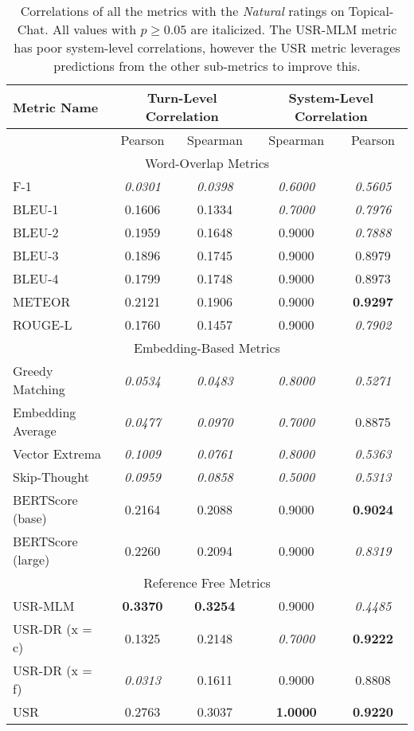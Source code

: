 \documentclass[11pt,a4paper]{article}
\begin{document}
\begin{table*}
    \centering
    \renewcommand*{\arraystretch}{1.2}
    \begin{tabular}{|l|c|c|c|c|}
    \hline
        \textbf{Metric Name} & \multicolumn{2}{|c|}{\textbf{Turn-Level Correlation}} & \multicolumn{2}{|c|}{\textbf{System-Level Correlation}}  \\ \hline
         & Pearson & Spearman & Spearman & Pearson \\ \hline
         \multicolumn{5}{|c|}{Word-Overlap Metrics} \\ \hline
F-1 & \textit{0.0301} & \textit{0.0398} & \textit{0.6000} & \textit{0.5605} \\
BLEU-1 & 0.1606 & 0.1334 & \textit{0.7000} & \textit{0.7976} \\
BLEU-2 & 0.1959 & 0.1648 & 0.9000 & \textit{0.7888} \\
BLEU-3 & 0.1896 & 0.1745 & 0.9000 & 0.8979 \\
BLEU-4 & 0.1799 & 0.1748 & 0.9000 & 0.8973 \\
METEOR & 0.2121 & 0.1906 & 0.9000 & \textbf{0.9297} \\
ROUGE-L & 0.1760 & 0.1457 & 0.9000 & \textit{0.7902} \\  \hline
\multicolumn{5}{|c|}{Embedding-Based Metrics} \\ \hline
Greedy Matching & \textit{0.0534} & \textit{0.0483} & \textit{0.8000} & \textit{0.5271} \\
Embedding Average & \textit{0.0477} & \textit{0.0970} & \textit{0.7000} & 0.8875 \\
Vector Extrema & \textit{0.1009} & \textit{0.0761} & \textit{0.8000} & \textit{0.5363} \\
Skip-Thought & \textit{0.0959} & \textit{0.0858} & \textit{0.5000} & \textit{0.5313} \\
BERTScore (base) & 0.2164 & 0.2088 & 0.9000 & \textbf{0.9024} \\
BERTScore (large) & 0.2260 & 0.2094 & 0.9000 & \textit{0.8319} \\ \hline
\multicolumn{5}{|c|}{Reference Free Metrics} \\ \hline
USR-MLM & \textbf{0.3370} & \textbf{0.3254} & 0.9000 & \textit{0.4485} \\
USR-DR (x = c) & 0.1325 & 0.2148 & \textit{0.7000} & \textbf{0.9222} \\
USR-DR (x = f) & \textit{0.0313} & 0.1611 & 0.9000 & 0.8808 \\
USR & 0.2763 & 0.3037 & \textbf{1.0000} & \textbf{0.9220} \\ \hline
    \end{tabular}
    \caption{Correlations of all the metrics with the \textit{Natural} ratings on Topical-Chat. All values with $p \geq 0.05$ are italicized. The USR-MLM metric has poor system-level correlations, however the USR metric leverages predictions from the other sub-metrics to improve this. }
    
\end{table*}
\end{document}
